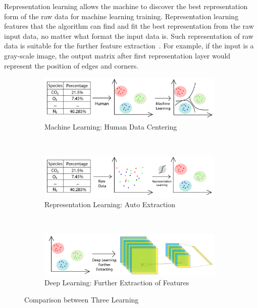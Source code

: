 \begin{spacing}{1.5}
Representation learning allows the machine to discover the best representation form of the raw data for machine learning training. Representation learning features that the algorithm can find and fit the best representation from the raw input data, no matter what format the input data is. Such representation of raw data is suitable for the further feature extraction~\cite{bengio2013representation}. For example, if the input is a gray-scale image, the output matrix after first representation layer would represent the position of edges and corners.

\begin{figure}[th]
    \centering
    \begin{subfigure}[b]{0.99\textwidth}
        \centering
        \includegraphics[width=0.98\textwidth, fbox]{Chapter2/Machine-Learing.pdf}
        \caption{Machine Learning: Human Data Centering}
        \label{fig:mldiagram} 
    \end{subfigure}%
    \\
    \begin{subfigure}[b]{0.99\textwidth}
        \centering
        \includegraphics[width=0.98\textwidth, fbox]{Chapter2/Represent-Learing.pdf}
        \caption{Representation Learning: Auto Extraction}
        \label{fig:representdiagram} 
    \end{subfigure}
    \\
    \begin{subfigure}[b]{0.99\textwidth}
        \centering
        \includegraphics[width=0.98\textwidth, fbox]{Chapter2/Deep-Learing.pdf}
        \caption{Deep Learning: Further Extraction of Features}
        \label{fig:dldiagram} 
    \end{subfigure}%
    \caption{Comparison between Three Learning}
\end{figure}


\end{spacing}
